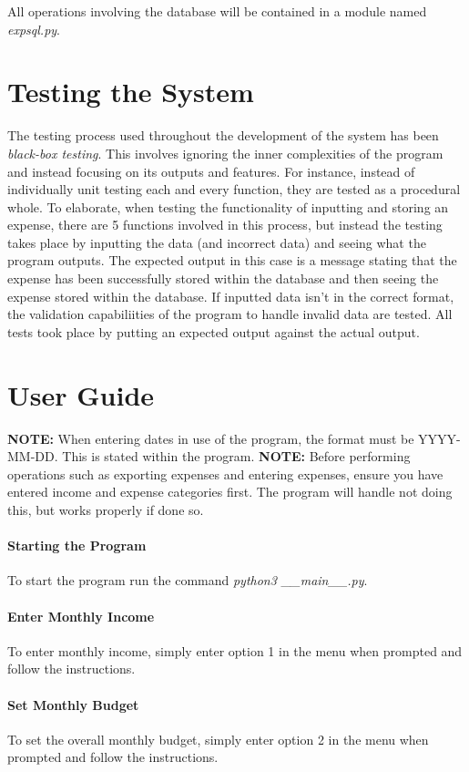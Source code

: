 \documentclass[11pt]{article}
\begin{document}
  All operations involving the database will be contained in a module named \textit{expsql.py}.

  \section{Testing the System}
  The testing process used throughout the development of the system has been \textit{black-box testing}. This involves ignoring the inner complexities of the program and instead focusing on its outputs and features. For instance, instead of individually unit testing each and every function, they are tested as a procedural whole. To elaborate, when testing the functionality of inputting and storing an expense, there are 5 functions involved in this process, but instead the testing takes place by inputting the data (and incorrect data) and seeing what the program outputs. The expected output in this case is a message stating that the expense has been successfully stored within the database and then seeing the expense stored within the database. If inputted data isn't in the correct format, the validation capabiliities of the program to handle invalid data are tested. All tests took place by putting an expected output against the actual output.

  \appendix
  \section{User Guide}
  \textbf{NOTE:} When entering dates in use of the program, the format must be YYYY-MM-DD. This is stated within the program.
  \textbf{NOTE:} Before performing operations such as exporting expenses and entering expenses, ensure you have entered income and expense categories first. The program will handle not doing this, but works properly if done so.
  \paragraph{Starting the Program} To start the program run the command \textit{python3 \_\_main\_\_.py}. 
  \paragraph{Enter Monthly Income}
  To enter monthly income, simply enter option 1 in the menu when prompted and follow the instructions.
  \paragraph{Set Monthly Budget}
  To set the overall monthly budget, simply enter option 2 in the menu when prompted and follow the instructions.
\end{document}
